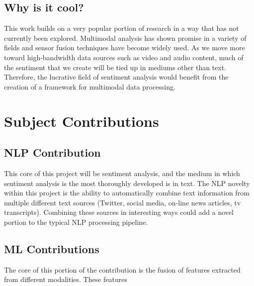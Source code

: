 \documentclass[paper=a4, fontsize=11pt]{scrartcl} %
\begin{document}
\subsection{Why is it cool?}
This work builds on a very popular portion of research in a way that has not currently been explored. 
Multimodal analysis has shown promise in a variety of fields and sensor fusion techniques have become widely used.
As we move more toward high-bandwidth data sources such as video and audio content, much of the sentiment that we create will be tied up in mediums other than text.
Therefore, the lucrative field of sentiment analysis would benefit from the creation of a framework for multimodal data processing.

\section{Subject Contributions}
\subsection{NLP Contribution}
This core of this project will be sentiment analysis, and the medium in which sentiment analysis is the most thoroughly developed is in text.
The NLP novelty within this project is the ability to automatically combine text information from multiple different text sources (Twitter, social media, on-line news articles, tv transcripts).
Combining these sources in interesting ways could add a novel portion to the typical NLP processing pipeline.

\subsection{ML Contributions}
The core of this portion of the contribution is the fusion of features extracted from different modalities.
These features 





\end{document}
